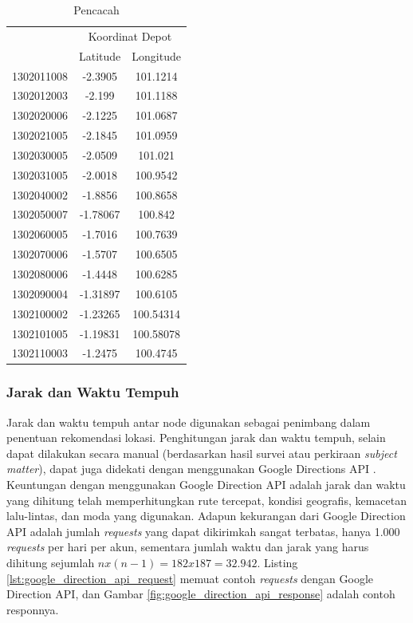 \begin{table}[h]
	\centering
	\caption{Pencacah}
	\label{tbl:enumerator}
	\begin{tabular}{lcc}
		\toprule
			& \multicolumn{2}{c}{Koordinat Depot}\\
		\cmidrule{2-3}
			& Latitude & Longitude\\ 
		\midrule
			1302011008 & -2.3905 & 101.1214\\
			1302012003 & -2.199 & 101.1188\\
			1302020006 & -2.1225 & 101.0687\\
			1302021005 & -2.1845 & 101.0959\\
			1302030005 & -2.0509 & 101.021\\
			1302031005 & -2.0018 & 100.9542\\
			1302040002 & -1.8856 & 100.8658\\
			1302050007 & -1.78067 & 100.842\\
			1302060005 & -1.7016 & 100.7639\\
			1302070006 & -1.5707 & 100.6505\\
			1302080006 & -1.4448 & 100.6285\\
			1302090004 & -1.31897 & 100.6105\\
			1302100002 & -1.23265 & 100.54314\\
			1302101005 & -1.19831 & 100.58078\\
			1302110003 & -1.2475 & 100.4745\\
		\bottomrule
	\end{tabular}
\end{table}


\subsubsection{Jarak dan Waktu Tempuh}
Jarak dan waktu tempuh antar node digunakan sebagai penimbang dalam penentuan rekomendasi lokasi. Penghitungan jarak dan waktu tempuh, selain dapat dilakukan secara manual (berdasarkan hasil survei atau perkiraan \textit{subject matter}), dapat juga didekati dengan menggunakan Google Directions API \citep{google_google_2016}. Keuntungan dengan menggunakan Google Direction API adalah jarak dan waktu yang dihitung telah memperhitungkan rute tercepat, kondisi geografis, kemacetan lalu-lintas, dan moda yang digunakan. Adapun kekurangan dari Google Direction API adalah jumlah \textit{requests} yang dapat dikirimkah sangat terbatas, hanya 1.000 \textit{requests} per hari per akun, sementara jumlah waktu dan jarak yang harus dihitung sejumlah $ nx(n-1) = 182x187 = 32.942 $. Listing \ref{lst:google_direction_api_request} memuat contoh \textit{requests} dengan Google Direction API, dan Gambar \ref{fig:google_direction_api_response} adalah contoh responnya.


